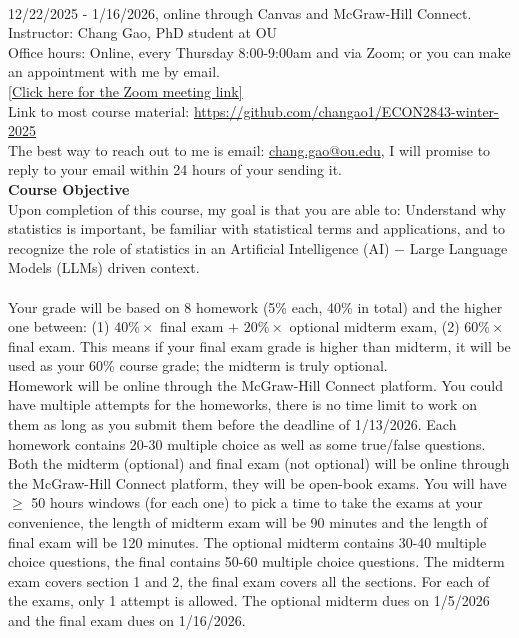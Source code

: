 \documentclass[12pt,letterpaper]{article}
\begin{document}
	\bigskip\\
	 12/22/2025 - 1/16/2026, online through Canvas and McGraw-Hill Connect.\medskip\\
	\noindent Instructor: Chang Gao, PhD student at OU\medskip\\
	\noindent Office hours: Online, every Thursday 8:00-9:00am and via Zoom; or you can make an appointment with me by email.\medskip\\
	\href{https://oklahoma.zoom.us/j/94343208280?pwd=BgRpuId5QMit0InqpbYnbpCEPlXtNO.1
	}{[Click here for the Zoom meeting link]}\smallskip\\
	\noindent Link to most course material: \href{https://github.com/changao1/ECON2843-winter-2025}{https://github.com/changao1/ECON2843-winter-2025}\smallskip\\
	\noindent The best way to reach out to me is email: \href{mailto:chang.gao@ou.edu}{chang.gao@ou.edu}, I will promise to reply to your email within 24 hours of your sending it.\bigskip\\
	{\bf Course Objective}\medskip\\
	Upon completion of this course, my goal is that you are able to: Understand why statistics is important, be familiar with statistical terms and applications, and to recognize the role of statistics in an Artificial Intelligence (AI) $-$ Large Language Models (LLMs) driven context.\bigskip\\
	\medskip\\
	Your grade will be based on 8 homework (5\% each, 40\% in total) and the higher one between: (1) $40\%\times$  final exam $+$ $20\%\times$ optional midterm exam, (2) $60\%\times$ final exam. This means if your final exam grade is higher than midterm, it will be used as your $60\%$ course grade; {\color{blue}the midterm is truly optional}.\medskip\\
	Homework will be online through the McGraw-Hill Connect platform. You could have multiple attempts for the homeworks, there is no time limit to work on them as long as you submit them before the deadline of 1/13/2026. Each homework contains 20-30 multiple choice as well as some true/false questions.\medskip\\
	Both the midterm (optional) and final exam (not optional) will be online through the McGraw-Hill Connect platform, they will be open-book exams. You will have $\ge$ 50 hours windows (for each one) to pick a time to take the exams at your convenience, the length of midterm exam will be 90 minutes and the length of final exam will be 120 minutes. The optional midterm contains 30-40 multiple choice questions, the final contains 50-60 multiple choice questions. The midterm exam covers section 1 and 2, the final exam covers all the sections. For each of the exams, {\color{blue}only 1 attempt is allowed}. The optional midterm dues on 1/5/2026 and the final exam dues on 1/16/2026.\bigskip\\
\end{document}
